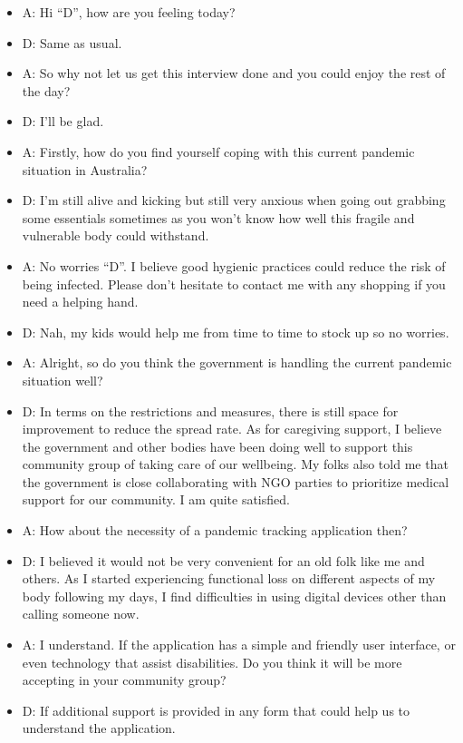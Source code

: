 \begin{appendices}
      \begin{itemize}
        \item A: Hi “D”, how are you feeling today?
        \item D: Same as usual.
        \item A: So why not let us get this interview done and you could enjoy the rest of the day?
        \item D: I’ll be glad.
        \item A: Firstly, how do you find yourself coping with this current pandemic situation in Australia?
        \item D: I’m still alive and kicking but still very anxious when going out grabbing some essentials
        sometimes as you won’t know how well this fragile and vulnerable body could withstand.
        \item A: No worries “D”. I believe good hygienic practices could reduce the risk of being infected.
        Please don’t hesitate to contact me with any shopping if you need a helping hand.
        \item D: Nah, my kids would help me from time to time to stock up so no worries.
        \item A: Alright, so do you think the government is handling the current pandemic situation well?
        \item D: In terms on the restrictions and measures, there is still space for improvement to reduce the
        spread rate. As for caregiving support, I believe the government and other bodies have been
        doing well to support this community group of taking care of our wellbeing. My folks also
        told me that the government is close collaborating with NGO parties to prioritize medical
        support for our community. I am quite satisfied.
        \item A: How about the necessity of a pandemic tracking application then?
        \item D: I believed it would not be very convenient for an old folk like me and others. As I started
        experiencing functional loss on different aspects of my body following my days, I find
        difficulties in using digital devices other than calling someone now.
        \item A: I understand. If the application has a simple and friendly user interface, or even technology
        that assist disabilities. Do you think it will be more accepting in your community group?
        \item D: If additional support is provided in any form that could help us to understand the application.

\end{itemize}
\end{appendices}
